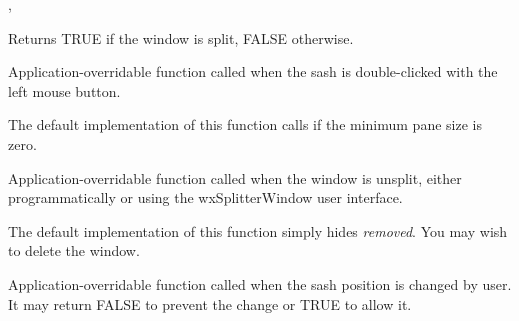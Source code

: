 ,\rtfsp
{}

\label{wxsplitterwindowissplit}


Returns TRUE if the window is split, FALSE otherwise.

\label{wxsplitterwindowondoubleclicksash}


Application-overridable function called when the sash is double-clicked with
the left mouse button.





The default implementation of this function calls  if
the minimum pane size is zero.



\label{wxsplitterwindowonunsplit}


Application-overridable function called when the window is unsplit, either
programmatically or using the wxSplitterWindow user interface.




The default implementation of this function simply hides {\it removed}. You
may wish to delete the window.

\label{wxsplitterwindowonsashpositionchange}


Application-overridable function called when the sash position is changed by 
user. It may return FALSE to prevent the change or TRUE to allow it.

